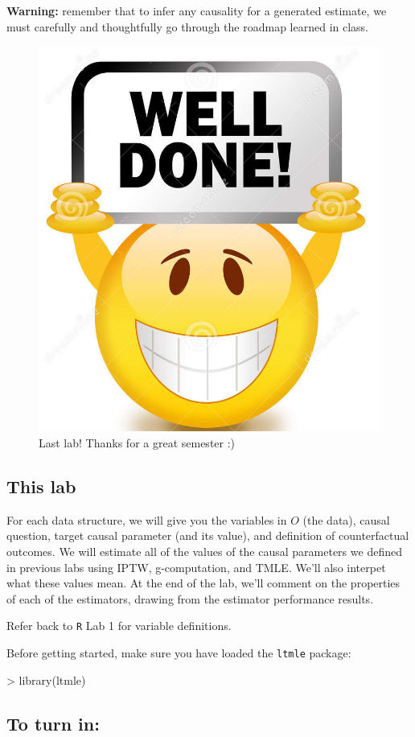 \documentclass[answers]{exam}
\begin{document}
\noindent \textbf{Warning:} remember that to infer any causality for a generated estimate, we must carefully and thoughtfully go through the roadmap learned in class. 

\begin{figure}
\begin{center}
\includegraphics[width=.15\textwidth]{welldone.png}
\caption{Last lab! Thanks for a great semester :)}
\end{center}
\end{figure}

\subsection{This lab}
For each data structure, we will give you the	variables in $O$ (the data), causal question, target causal parameter (and its value), and definition of counterfactual outcomes. We will estimate all of the values of the causal parameters we defined in previous labs using IPTW, g-computation, and TMLE. We'll also interpet what these values mean. At the end of the lab, we'll comment on the properties of each of the estimators, drawing from the estimator performance results.

\noindent Refer back to \texttt{R} Lab 1 for variable definitions.

\noindent Before getting started, make sure you have loaded the \texttt{ltmle} package:
\begin{Schunk}
\begin{Sinput}
> library(ltmle)
\end{Sinput}
\end{Schunk}

\subsection{To turn in:}


\noindent{}
\end{document}
